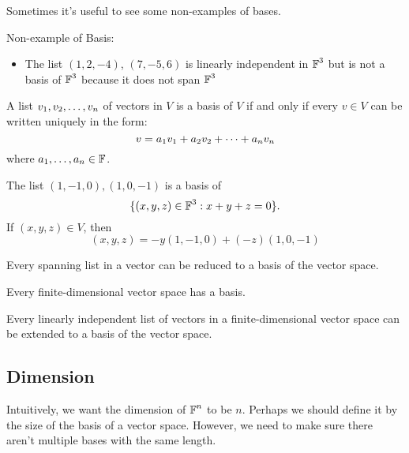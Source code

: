 Sometimes it's useful to see some non-examples of bases.

\begin{example} Non-example of Basis:
    \begin{itemize}
        \item The list $(1, 2, -4)$, $(7, -5, 6)$ is linearly independent
        in $\operatorname{\mathbb{F}}^3$ but is not a basis of $\operatorname{\mathbb{F}}^3$ because it does not span $\operatorname{\mathbb{F}}^3$
    \end{itemize}
\end{example}

\begin{theorem} 
    A list $v_1, v_2, \ldots, v_n$ of vectors in $V$ is a basis of $V$ if and only if every
    $v \in V$ can be written uniquely in the form:
    \[ v = a_1v_1 + a_2v_2 + \cdots + a_nv_n \]
    where $a_1, \dots, a_n \in \operatorname{\mathbb{F}}$.
\end{theorem}

\begin{example}
    The list $(1, -1, 0), (1, 0, -1)$ is a basis of 
       \[ \{(x, y, z) \in \operatorname{\mathbb{F}}^3 : x + y + z = 0\}. \]
    If $(x, y, z) \in V$, then
    \[ (x, y, z) = -y(1, -1, 0) + (-z)(1, 0, -1) \]
\end{example}

\begin{theorem} 
    Every spanning list in a vector can be reduced to a basis of the vector space.
\end{theorem}

\begin{theorem} 
    Every finite-dimensional vector space has a basis.
\end{theorem}

\begin{theorem} 
    Every linearly independent list of vectors in a finite-dimensional
    vector space can be extended to a basis of the vector space.
\end{theorem}

\subsection{Dimension}

Intuitively, we want the dimension of $\operatorname{\mathbb{F}}^n$ to be $n$. Perhaps
we should define it by the size of the basis of a vector space.
However, we need to make sure there aren't multiple bases with the
same length.

